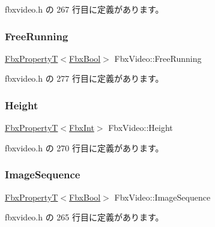  fbxvideo.\+h の 267 行目に定義があります。

\mbox{\label{class_fbx_video_abb47ae8cd752b8846cda1ad1d7e1ffff}} 
\subsubsection{\texorpdfstring{Free\+Running}{FreeRunning}}
{\footnotesize\ttfamily \hyperlink{class_fbx_property_t}{Fbx\+PropertyT}$<$\hyperlink{fbxtypes_8h_a92e0562b2fe33e76a242f498b362262e}{Fbx\+Bool}$>$ Fbx\+Video\+::\+Free\+Running}



 fbxvideo.\+h の 277 行目に定義があります。

\mbox{\label{class_fbx_video_a9e77b423cac730992fe57429c302593c}} 
\subsubsection{\texorpdfstring{Height}{Height}}
{\footnotesize\ttfamily \hyperlink{class_fbx_property_t}{Fbx\+PropertyT}$<$\hyperlink{fbxtypes_8h_a088fa96de3b0b3ea69f0f6afef525dfb}{Fbx\+Int}$>$ Fbx\+Video\+::\+Height}



 fbxvideo.\+h の 270 行目に定義があります。

\mbox{\label{class_fbx_video_a8d98e668bd42f8ed67e8bc28488d0abb}} 
\subsubsection{\texorpdfstring{Image\+Sequence}{ImageSequence}}
{\footnotesize\ttfamily \hyperlink{class_fbx_property_t}{Fbx\+PropertyT}$<$\hyperlink{fbxtypes_8h_a92e0562b2fe33e76a242f498b362262e}{Fbx\+Bool}$>$ Fbx\+Video\+::\+Image\+Sequence}



 fbxvideo.\+h の 265 行目に定義があります。

\mbox{\label{class_fbx_video_acc7a05788def81e3b7b1cb3d003021fb}} 
